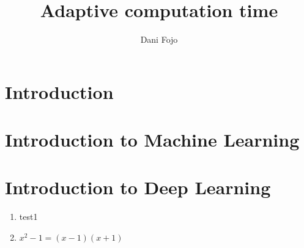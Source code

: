 \documentclass[12pt]{report}
\title{Adaptive computation time}
\author{Dani Fojo}
\begin{document}
\maketitle

\chapter{Introduction}
\chapter{Introduction to Machine Learning}
\chapter{Introduction to Deep Learning}

\begin{enumerate}
	\item test1
	\item \(x^2-1 = (x-1)(x+1)\)

\end{enumerate}
\end{document}
